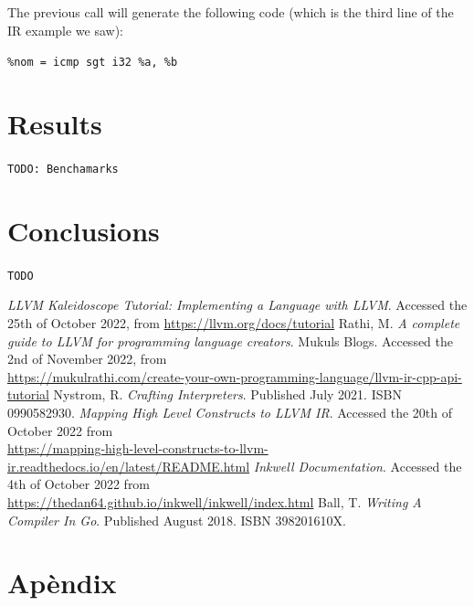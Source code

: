 ﻿\documentclass[10pt,a4paper,twocolumn,twoside]{article}
\begin{document}
The previous call will generate the following code (which is the third line of
the IR example we saw):

\texttt{\%nom = icmp sgt i32 \%a, \%b}

\section{Results}
\texttt{TODO: Benchamarks}

\section{Conclusions}
\texttt{TODO}

\begin{thebibliography}{11}

 \textit{LLVM Kaleidoscope Tutorial: Implementing a Language with LLVM}. Accessed the 25th of October 2022, from \url{https://llvm.org/docs/tutorial}
 Rathi, M. \textit{A complete guide to LLVM for programming language creators}. Mukuls Blogs. Accessed the 2nd of November 2022, from \\\url{https://mukulrathi.com/create-your-own-programming-language/llvm-ir-cpp-api-tutorial}
 Nystrom, R. \textit{Crafting Interpreters}. Published July 2021. ISBN 0990582930.
 \textit{Mapping High Level Constructs to LLVM IR}. Accessed the 20th of October 2022 from \\\url{https://mapping-high-level-constructs-to-llvm-ir.readthedocs.io/en/latest/README.html}
 \textit{Inkwell Documentation}. Accessed the 4th of October 2022 from \\\url{https://thedan64.github.io/inkwell/inkwell/index.html}
 Ball, T. \textit{Writing A Compiler In Go}. Published August 2018. ISBN 398201610X.

\end{thebibliography}

\appendix

\section*{Apèndix}
\end{document}
